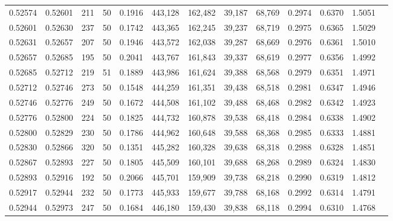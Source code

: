 \begin{tabular}{rrrrrrrrrrrrr}
0.52574 & 0.52601 &   211 &  50 &                                     0.1916 & 443,128 & 162,482 &  39,187 &  68,769 & 0.2974 & 0.6370 & 1.5051 \\
0.52601 & 0.52630 &   237 &  50 &                                     0.1742 & 443,365 & 162,245 &  39,237 &  68,719 & 0.2975 & 0.6365 & 1.5029 \\
0.52631 & 0.52657 &   207 &  50 &                                     0.1946 & 443,572 & 162,038 &  39,287 &  68,669 & 0.2976 & 0.6361 & 1.5010 \\
0.52657 & 0.52685 &   195 &  50 &                                     0.2041 & 443,767 & 161,843 &  39,337 &  68,619 & 0.2977 & 0.6356 & 1.4992 \\
0.52685 & 0.52712 &   219 &  51 &                                     0.1889 & 443,986 & 161,624 &  39,388 &  68,568 & 0.2979 & 0.6351 & 1.4971 \\
0.52712 & 0.52746 &   273 &  50 &                                     0.1548 & 444,259 & 161,351 &  39,438 &  68,518 & 0.2981 & 0.6347 & 1.4946 \\
0.52746 & 0.52776 &   249 &  50 &                                     0.1672 & 444,508 & 161,102 &  39,488 &  68,468 & 0.2982 & 0.6342 & 1.4923 \\
0.52776 & 0.52800 &   224 &  50 &                                     0.1825 & 444,732 & 160,878 &  39,538 &  68,418 & 0.2984 & 0.6338 & 1.4902 \\
0.52800 & 0.52829 &   230 &  50 &                                     0.1786 & 444,962 & 160,648 &  39,588 &  68,368 & 0.2985 & 0.6333 & 1.4881 \\
0.52830 & 0.52866 &   320 &  50 &                                     0.1351 & 445,282 & 160,328 &  39,638 &  68,318 & 0.2988 & 0.6328 & 1.4851 \\
0.52867 & 0.52893 &   227 &  50 &                                     0.1805 & 445,509 & 160,101 &  39,688 &  68,268 & 0.2989 & 0.6324 & 1.4830 \\
0.52893 & 0.52916 &   192 &  50 &                                     0.2066 & 445,701 & 159,909 &  39,738 &  68,218 & 0.2990 & 0.6319 & 1.4812 \\
0.52917 & 0.52944 &   232 &  50 &                                     0.1773 & 445,933 & 159,677 &  39,788 &  68,168 & 0.2992 & 0.6314 & 1.4791 \\
0.52944 & 0.52973 &   247 &  50 &                                     0.1684 & 446,180 & 159,430 &  39,838 &  68,118 & 0.2994 & 0.6310 & 1.4768 \\

\end{tabular}
